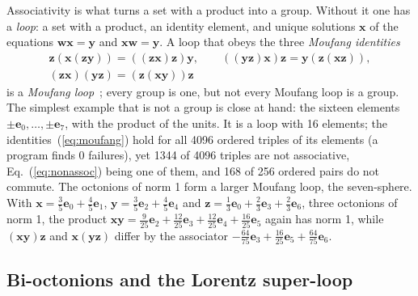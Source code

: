 \documentclass[aps,prd,twocolumn,superscriptaddress,nofootinbib,floatfix,longbibliography]{revtex4-2}
\newcommand{\e}[1]{\mathbf e_{#1}}
\begin{document}
Associativity is what turns a set with a product into a group. Without it one has a \emph{loop}: a set with a product,
an identity element, and unique solutions $\mathbf x$ of the equations $\mathbf w\mathbf x=\mathbf y$ and $\mathbf
x\mathbf w=\mathbf y$. A loop that obeys the three \emph{Moufang identities}
\begin{equation}
\begin{gathered}
\mathbf z(\mathbf x(\mathbf z\mathbf y))=((\mathbf z\mathbf x)\mathbf z)\mathbf y,\qquad
((\mathbf y\mathbf z)\mathbf x)\mathbf z=\mathbf y(\mathbf z(\mathbf x\mathbf z)),\\
(\mathbf z\mathbf x)(\mathbf y\mathbf z)=(\mathbf z(\mathbf x\mathbf y))\mathbf z
\end{gathered}
\label{eq:moufang}
\end{equation}
is a \emph{Moufang loop}~\cite{Moufang1935}; every group is one, but not every Moufang loop is a group. The simplest
example that is not a group is close at hand: the sixteen elements $\pm\e0,\dots,\pm\e7$, with the product of the
units. It is a loop with 16 elements; the identities~(\ref{eq:moufang}) hold for all 4096
ordered triples of its elements (a program finds 0 failures), yet 1344 of 4096 triples are not
associative, Eq.~(\ref{eq:nonassoc}) being one of them, and 168 of 256 ordered pairs do not commute.
The octonions of norm 1 form a larger Moufang loop, the seven-sphere. With $\mathbf x=\tfrac{3}{5}\e{0}+\tfrac{4}{5}\e{1}$,
$\mathbf y=\tfrac{3}{5}\e{2}+\tfrac{4}{5}\e{4}$ and $\mathbf z=\tfrac{1}{3}\e{0}+\tfrac{2}{3}\e{3}+\tfrac{2}{3}\e{6}$, three octonions of norm 1, the product $\mathbf x\mathbf y=
\tfrac{9}{25}\e{2}+\tfrac{12}{25}\e{3}+\tfrac{12}{25}\e{4}+\tfrac{16}{25}\e{5}$ again has norm 1, while $(\mathbf x\mathbf y)\mathbf z$ and $\mathbf x(\mathbf y\mathbf z)$ differ by the
associator $-\tfrac{64}{75}\e{3}+\tfrac{16}{25}\e{5}+\tfrac{64}{75}\e{6}$.

\subsection{Bi-octonions and the Lorentz super-loop}
\label{sec:bioct}
\end{document}
